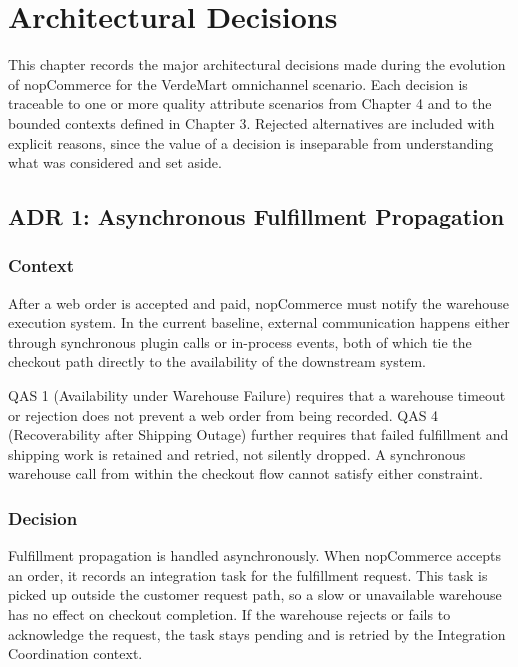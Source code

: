 \chapter{Architectural Decisions}

This chapter records the major architectural decisions made during the evolution of nopCommerce
for the VerdeMart omnichannel scenario. Each decision is traceable to one or more quality
attribute scenarios from Chapter 4 and to the bounded contexts defined in Chapter 3. Rejected
alternatives are included with explicit reasons, since the value of a decision is inseparable
from understanding what was considered and set aside.

\section{ADR 1: Asynchronous Fulfillment Propagation}

\subsection{Context}

After a web order is accepted and paid, nopCommerce must notify the warehouse execution system.
In the current baseline, external communication happens either through synchronous plugin calls
or in-process events, both of which tie the checkout path directly to the availability of the
downstream system.

QAS 1 (Availability under Warehouse Failure) requires that a warehouse timeout or
rejection does not prevent a web order from being recorded. QAS 4 (Recoverability after
Shipping Outage) further requires that failed fulfillment and shipping work is retained and
retried, not silently dropped. A synchronous warehouse call from within the checkout flow
cannot satisfy either constraint.

\subsection{Decision}

Fulfillment propagation is handled asynchronously. When nopCommerce accepts an order, it
records an integration task for the fulfillment request. This task is picked up outside the
customer request path, so a slow or unavailable warehouse has no effect on checkout completion.
If the warehouse rejects or fails to acknowledge the request, the task stays pending and is
retried by the Integration Coordination context.

